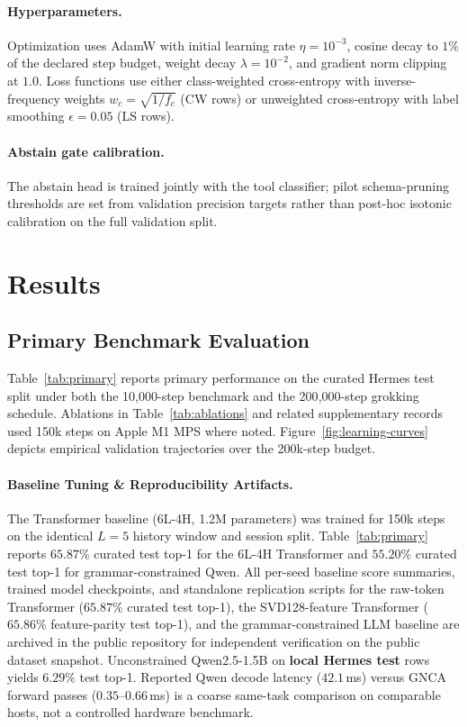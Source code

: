 \documentclass[10pt,twocolumn,letterpaper]{article}
\begin{document}
\paragraph{Hyperparameters.}
Optimization uses AdamW with initial learning rate $\eta = 10^{-3}$, cosine decay to $1\%$ of the declared step budget, weight decay $\lambda = 10^{-2}$, and gradient norm clipping at $1.0$. Loss functions use either class-weighted cross-entropy with inverse-frequency weights $w_c = \sqrt{1 / f_c}$ (CW rows) or unweighted cross-entropy with label smoothing $\epsilon = 0.05$ (LS rows).

\paragraph{Abstain gate calibration.}
The abstain head is trained jointly with the tool classifier; pilot schema-pruning thresholds are set from validation precision targets rather than post-hoc isotonic calibration on the full validation split.

\section{Results}

\subsection{Primary Benchmark Evaluation}
Table~\ref{tab:primary} reports primary performance on the curated Hermes test split under both the 10{,}000-step benchmark and the 200{,}000-step grokking schedule. Ablations in Table~\ref{tab:ablations} and related supplementary records used 150k steps on Apple M1 MPS where noted. Figure~\ref{fig:learning-curves} depicts empirical validation trajectories over the 200k-step budget.

\paragraph{Baseline Tuning \& Reproducibility Artifacts.}
The Transformer baseline (6L-4H, 1.2M parameters) was trained for 150k steps on the identical $L=5$ history window and session split. Table~\ref{tab:primary} reports $65.87\%$ curated test top-1 for the 6L-4H Transformer and $55.20\%$ curated test top-1 for grammar-constrained Qwen. All per-seed baseline score summaries, trained model checkpoints, and standalone replication scripts for the raw-token Transformer ($65.87\%$ curated test top-1), the SVD128-feature Transformer ($65.86\%$ feature-parity test top-1), and the grammar-constrained LLM baseline are archived in the public repository for independent verification on the public dataset snapshot. Unconstrained Qwen2.5-1.5B on \textbf{local Hermes test} rows yields $6.29\%$ test top-1. Reported Qwen decode latency ($42.1$\,ms) versus GNCA forward passes ($0.35$--$0.66$\,ms) is a coarse same-task comparison on comparable hosts, not a controlled hardware benchmark.
\end{document}
